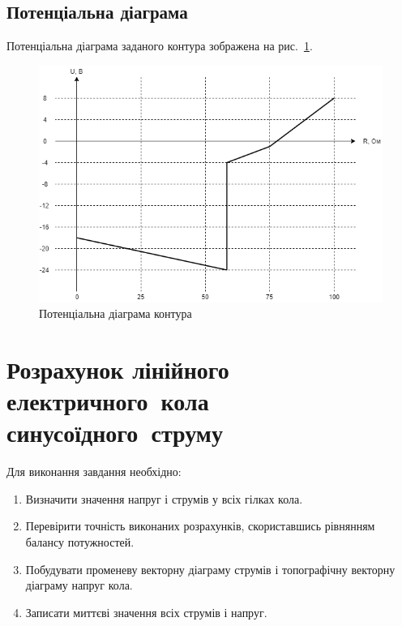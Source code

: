 \documentclass[a4paper,oneside,DIV=12,12pt]{scrartcl}
\begin{document}
		\subsection{Потенціальна діаграма}
			Потенціальна діаграма заданого контура зображена на рис.~\ref{fig:potential-diagram}.
			\begin{figure}[!htbp]
			\centering
				\includegraphics[width = \textwidth]{assets/01-03-diagram-potential.png}
			\caption{Потенціальна діаграма контура}
			\label{fig:potential-diagram}
			\end{figure}
			
	\section{Розрахунок лінійного електричного~кола синусоїдного~струму}
		Для виконання завдання необхідно:
		\begin{enumerate}
			\item Визначити значення напруг і струмів у всіх гілках кола.
			\item Перевірити точність виконаних розрахунків, скориставшись рівнянням балансу потужностей.
			\item Побудувати променеву векторну діаграму струмів і топографічну векторну діаграму напруг кола.
			\item Записати миттєві значення всіх струмів і напруг.
		\end{enumerate}
		
\end{document}
